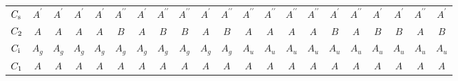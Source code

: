 \documentclass[fleqn,9pt,landscape]{jsarticle}
\begin{document}
\begin{table}[ht!]
\begin{center}
\begin{tabular}{c|cccccccccc|cccccccccc}
$C_{\rm s}$ & $A^{\prime}$ & $A^{\prime}$ & $A^{\prime}$ & $A^{\prime}$ & $A^{\prime\prime}$ & $A^{\prime}$ & $A^{\prime\prime}$ & $A^{\prime\prime}$ & $A^{\prime}$ & $A^{\prime\prime}$ & $A^{\prime\prime}$ & $A^{\prime\prime}$ & $A^{\prime\prime}$ & $A^{\prime\prime}$ & $A^{\prime}$ & $A^{\prime\prime}$ & $A^{\prime}$ & $A^{\prime}$ & $A^{\prime\prime}$ & $A^{\prime}$ \\
$C_{\rm 2}$ & $A$ & $A$ & $A$ & $A$ & $B$ & $A$ & $B$ & $B$ & $A$ & $B$ & $A$ & $A$ & $A$ & $A$ & $B$ & $A$ & $B$ & $B$ & $A$ & $B$ \\ \hline
$C_{\rm i}$ & $A_{g}$ & $A_{g}$ & $A_{g}$ & $A_{g}$ & $A_{g}$ & $A_{g}$ & $A_{g}$ & $A_{g}$ & $A_{g}$ & $A_{g}$ & $A_{u}$ & $A_{u}$ & $A_{u}$ & $A_{u}$ & $A_{u}$ & $A_{u}$ & $A_{u}$ & $A_{u}$ & $A_{u}$ & $A_{u}$ \\
$C_{\rm 1}$ & $A$ & $A$ & $A$ & $A$ & $A$ & $A$ & $A$ & $A$ & $A$ & $A$ & $A$ & $A$ & $A$ & $A$ & $A$ & $A$ & $A$ & $A$ & $A$ & $A$ \\
 \hline \hline
\end{tabular}
\end{center}
\end{table}
\newpage
\end{document}
